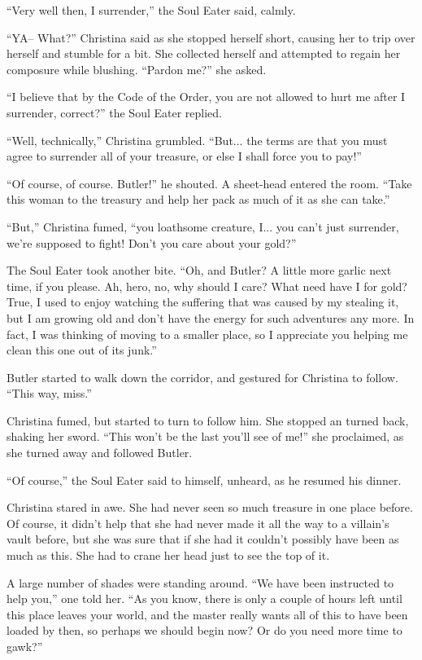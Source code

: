 \documentclass[showtrims,b6paper,draft,10pt]{memoir}
\begin{document}
``Very well then, I surrender,'' the Soul Eater said, calmly.

``YA-- What?'' Christina said as she stopped herself short, causing her to trip over herself and stumble for a bit.  She collected herself and attempted to regain her composure while blushing.  ``Pardon me?'' she asked.

``I believe that by the Code of the Order, you are not allowed to hurt me after I surrender, correct?'' the Soul Eater replied.

``Well, technically,'' Christina grumbled.  ``But... the terms are that you must agree to surrender all of your treasure, or else I shall force you to pay!''

``Of course, of course.  Butler!''  he shouted.  A sheet-head entered the room.  ``Take this woman to the treasury and help her pack as much of it as she can take.''

``But,'' Christina fumed, ``you loathsome creature, I... you can't just surrender, we're supposed to fight!  Don't you care about your gold?''

The Soul Eater took another bite.  ``Oh, and Butler?  A little more garlic next time, if you please.  Ah, hero, no, why should I care?  What need have I for gold?  True, I used to enjoy watching the suffering that was caused by my stealing it, but I am growing old and don't have the energy for such adventures any more.  In fact, I was thinking of moving to a smaller place, so I appreciate you helping me clean this one out of its junk.''

Butler started to walk down the corridor, and gestured for Christina to follow.  ``This way, miss.''

Christina fumed, but started to turn to follow him.  She stopped an turned back, shaking her sword.  ``This won't be the last you'll see of me!'' she proclaimed, as she turned away and followed Butler.

``Of course,'' the Soul Eater said to himself, unheard, as he resumed his dinner.

\timeskip
Christina stared in awe.  She had never seen so much treasure in one place before.  Of course, it didn't help that she had never made it all the way to a villain's vault before, but she was sure that if she had it couldn't possibly have been as much as this.  She had to crane her head just to see the top of it.

A large number of shades were standing around.  ``We have been instructed to help you,'' one told her.  ``As you know, there is only a couple of hours left until this place leaves your world, and the master really wants all of this to have been loaded by then, so perhaps we should begin now?  Or do you need more time to gawk?''
\end{document}
